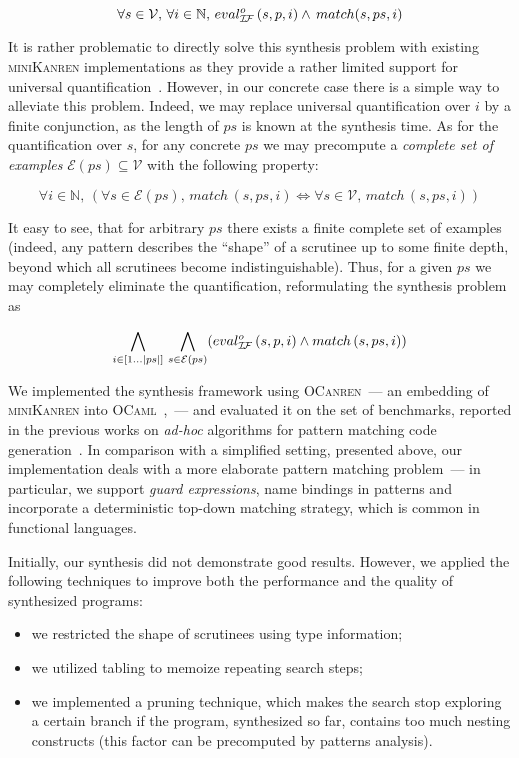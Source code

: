  \[
 \forall s\in\mathcal{V},\,\forall i\in\mathbb{N},\,eval^o_{\mathcal{I\!F}}\, (s, p, i) \wedge\, match (s, ps, i)
 \]
 
 It is rather problematic to directly solve this synthesis problem with existing \textsc{miniKanren} implementations as
 they provide a rather limited support for universal quantification~\cite{eigen,moiseenko}. However, in our concrete
 case there is a simple way to alleviate this problem. Indeed, we may replace universal quantification over $i$ by
 a finite conjunction, as the length of $ps$ is known at the synthesis time. As for the quantification over $s$, for
 any concrete $ps$ we may precompute a \emph{complete set of examples} $\mathcal{E}(ps)\subseteq\mathcal{V}$ with the following
 property:
 
 \[
 \forall i\in\mathbb{N},\,(\forall s\in\mathcal{E}(ps),\,match\, (s, ps, i) \Leftrightarrow \forall s\in\mathcal{V},\,match\, (s, ps, i))
 \]
 
 It easy to see, that for arbitrary $ps$ there exists a finite complete set of examples (indeed, any pattern describes the ``shape''
 of a scrutinee up to some finite depth, beyond which all scrutinees become indistinguishable). Thus, for a given $ps$ we may
 completely eliminate the quantification, reformulating the synthesis problem as
 
 \[
 \bigwedge_{i\in[1\dots|ps|]}\,\bigwedge_{s\in\mathcal{E}(ps)} (eval^o_{\mathcal{I\!F}}\, (s, p, i) \wedge match\, (s, ps, i))
 \]
 
 We implemented the synthesis framework using \textsc{OCanren}~--- an embedding of \textsc{miniKanren} into \textsc{OCaml}~\cite{ocanren},~---
 and evaluated it on the set of benchmarks, reported in the previous works on \emph{ad-hoc} algorithms for pattern matching
 code generation~\cite{maranget2001,maranget2008}. In comparison with a simplified setting, presented above, our implementation
 deals with a more elaborate pattern matching problem~--- in particular, we support \emph{guard expressions}, name bindings in
 patterns and incorporate a deterministic top-down matching strategy, which is common in functional languages.
 
 Initially, our synthesis did not demonstrate good results. However, we applied the following techniques to improve both the performance
 and the quality of synthesized programs:
 
 \begin{itemize}
 \item we restricted the shape of scrutinees using type information;
 \item we utilized tabling to memoize repeating search steps;
 \item we implemented a pruning technique, which makes the search stop exploring a certain branch if the program, synthesized so far,
   contains too much nesting constructs (this factor can be precomputed by patterns analysis).
 \end{itemize}
 
